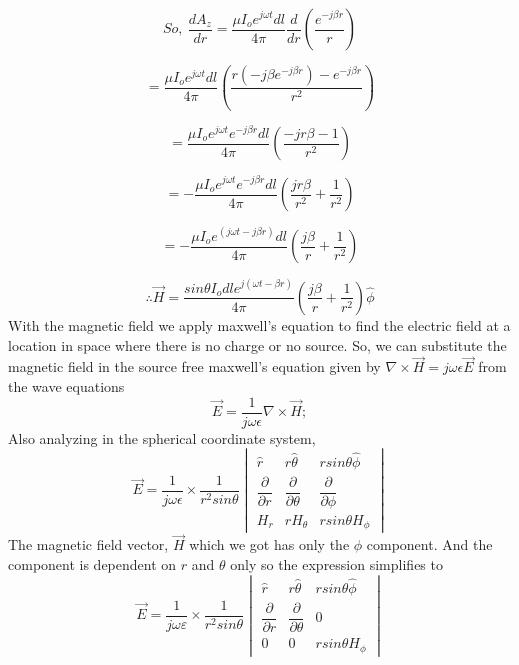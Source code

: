 $$So, \ \dfrac{dA_z}{dr} = \dfrac{\mu I_o e^{j\omega t} dl}{4\pi}\dfrac{d}{dr}\left(\dfrac{e^{-j\beta r}}{r}\right)$$

$$ = \dfrac{\mu I_o e^{j\omega t} dl}{4\pi} \left(\dfrac{r(-j\beta e^{-j\beta r}) - e^{-j\beta r}}{r^2}\right)$$

$$ = \dfrac{\mu I_o e^{j\omega t}e^{-j\beta r} dl}{4\pi}  \left(\dfrac{-jr\beta - 1}{r^2}\right)$$

$$ = - \dfrac{\mu I_o e^{j\omega t}e^{-j\beta r} dl}{4\pi} \left(\dfrac{jr\beta}{r^2} + \dfrac{1}{r^2}\right)$$

$$ = - \dfrac{\mu I_o e^{(j\omega t-j\beta r)} dl}{4\pi} \left(\dfrac{j\beta}{r} + \dfrac{1}{r^2}\right)$$

\begin{equation}
\therefore \vec{H} = \dfrac{sin\theta I_o dl e^{j(\omega t-\beta r)} }{4\pi} \left(\dfrac{j\beta}{r} + \dfrac{1}{r^2}\right)\hat{\phi}
\end{equation}
With the magnetic field we apply maxwell's equation to find the electric field at a location in space where there is no charge or no source. So, we can substitute the magnetic field in the source free maxwell's equation given by $\nabla \times \vec{H} = j\omega \epsilon\vec{E}$ from the wave equations 
$$\vec{E} = \dfrac{1}{j\omega \epsilon}\nabla \times \vec{H};$$Also analyzing in  the spherical coordinate system, 
\begin{equation*}
\vec{E}  = \dfrac{1}{j\omega \epsilon} \times \dfrac{1}{r^2sin\theta}
\begin{vmatrix}
\hat{r} & r\hat{\theta} & rsin\theta\hat{\phi} \\ 
\dfrac{\partial}{\partial r} & \dfrac{\partial}{\partial \theta} &  \dfrac{\partial}{\partial \phi} \\
H_r & rH_\theta & rsin\theta H_\phi              
\end{vmatrix}
\end{equation*}
The magnetic field vector, $\vec{H}$ which we got has only the $\phi$ component. And the component is dependent on $r$ and $\theta$ only so the expression simplifies to 
\begin{equation*}
\vec{E}  = \dfrac{1}{j\omega \varepsilon} \times \dfrac{1}{r^2sin\theta}
\begin{vmatrix}
\hat{r} & r\hat{\theta} & rsin\theta\hat{\phi} \\ 
\dfrac{\partial}{\partial r} & \dfrac{\partial}{\partial \theta} &  0 \\
0 & 0 & rsin\theta H_\phi              
\end{vmatrix}
\end{equation*}
